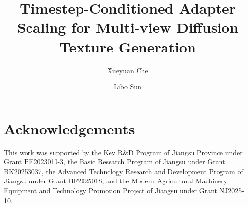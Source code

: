 \documentclass[times,preprint,12pt]{elsarticle}
\begin{document}
\begin{frontmatter}

\title{Timestep-Conditioned Adapter Scaling for Multi-view Diffusion Texture Generation}

\author[nju]{Xueyuan Che}
\author[nju]{Libo Sun}
\address[nju]{School of Instrument Science and Engineering, Southeast University, No.~2 Sipailou, Xuanwu District, Nanjing, 210096, Jiangsu, China}


\end{frontmatter}

\section*{Acknowledgements}

This work was supported by the Key R\&D Program of Jiangsu Province under Grant BE2023010-3, the Basic Research Program of Jiangsu under Grant BK20253037, the Advanced Technology Research and Development Program of Jiangsu under Grant BF2025018, and the Modern Agricultural Machinery Equipment and Technology Promotion Project of Jiangsu under Grant NJ2025-10.
\end{document}
